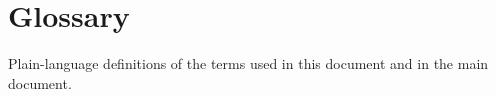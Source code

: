 \documentclass[11pt]{article}
\begin{document}
\section{Glossary}\label{sec:glossary}
Plain-language definitions of the terms used in this document and in the main document.


\end{document}
